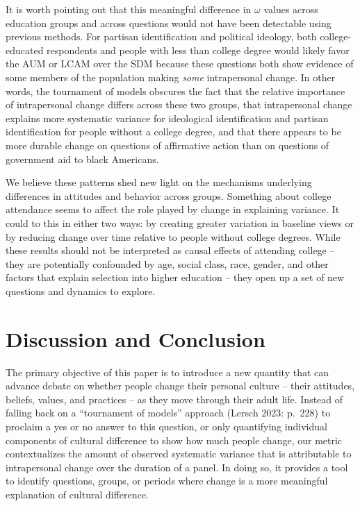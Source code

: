 \documentclass[
  11pt,
]{article}
\begin{document}
It is worth pointing out that this meaningful difference in \(\omega\)
values across education groups and across questions would not have been
detectable using previous methods. For partisan identification and
political ideology, both college-educated respondents and people with
less than college degree would likely favor the AUM or LCAM over the SDM
because these questions both show evidence of some members of the
population making \emph{some} intrapersonal change. In other words, the
tournament of models obscures the fact that the relative importance of
intrapersonal change differs across these two groups, that intrapersonal
change explains more systematic variance for ideological identification
and partisan identification for people without a college degree, and
that there appears to be more durable change on questions of affirmative
action than on questions of government aid to black Americans.

We believe these patterns shed new light on the mechanisms underlying
differences in attitudes and behavior across groups. Something about
college attendance seems to affect the role played by change in
explaining variance. It could to this in either two ways: by creating
greater variation in baseline views or by reducing change over time
relative to people without college degrees. While these results should
not be interpreted as causal effects of attending college -- they are
potentially confounded by age, social class, race, gender, and other
factors that explain selection into higher education -- they open up a
set of new questions and dynamics to explore.

\section{Discussion and Conclusion}\label{discussion-and-conclusion}

The primary objective of this paper is to introduce a new quantity that
can advance debate on whether people change their personal culture --
their attitudes, beliefs, values, and practices -- as they move through
their adult life. Instead of falling back on a ``tournament of models''
approach (Lersch 2023: p.~228) to proclaim a yes or no answer to this
question, or only quantifying individual components of cultural
difference to show how much people change, our metric contextualizes the
amount of observed systematic variance that is attributable to
intrapersonal change over the duration of a panel. In doing so, it
provides a tool to identify questions, groups, or periods where change
is a more meaningful explanation of cultural difference.
\end{document}
